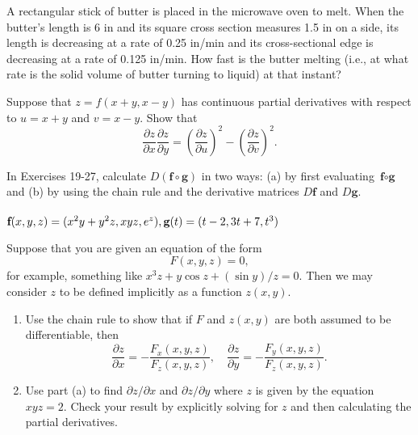 \documentclass[12pt,letterpaper]{hmcpset}
\newcommand{\pn}[1]{\left( #1 \right)}
\newcommand{\pf}[2]{\frac{\partial#1}{\partial#2}}
\begin{document}

\begin{problem}[2.5.6]
    A rectangular stick of butter is placed in the microwave oven to
    melt. When the butter's length is 6 in and its square cross
    section measures 1.5 in on a side, its length is decreasing at a
    rate of 0.25 in/min and its cross-sectional edge is decreasing at
    a rate of 0.125 in/min. How fast is the butter melting (i.e., at
    what rate is the solid volume of butter turning to liquid) at that
    instant?
\end{problem}
\begin{solution}
    \vfill
\end{solution}
\newpage

\begin{problem}[2.5.14]
    Suppose that $z=f(x+y,x-y)$ has continuous partial derivatives
    with respect to $u=x+y$ and $v=x-y$. Show that
    \[
        \pf{z}{x}\pf{z}{y}=\pn{\pf{z}{u}}^2-\pn{\pf{z}{v}}^2.
    \]
\end{problem}
\begin{solution}
    \vfill
\end{solution}
\newpage

\begin{problem}[2.5.24]
    In Exercises 19-27, calculate $D(\textbf{f}\circ\textbf{g})$ in
    two ways: (a) by first evaluating $\textbf{f}\circ\textbf{g}$ and
    (b) by using the chain rule and the derivative matrices
    $D\textbf{f}$ and $D\textbf{g}$.\\\\
    $\textbf{f}(x,y,z)=(x^2y+y^2z,xyz,e^z),\\
    \textbf{g}(t)=(t-2,3t+7,t^3)$
\end{problem}
\begin{solution}
    \vfill
\end{solution}
\newpage

\begin{problem}[2.5.36]
    Suppose that you are given an equation of the form
    \[
        F(x,y,z)=0,
    \]
    for example, something like $x^3z+y\cos z+(\sin y)/z=0$. Then we
    may consider $z$ to be defined implicitly as a function $z(x,y)$.
    \begin{enumerate}
        \item Use the chain rule to show that if $F$ and $z(x,y)$ are
            both assumed to be differentiable, then
            \[
                \pf{z}{x}=-\frac{F_x(x,y,z)}{F_z(x,y,z)},\quad
                \pf{z}{y}=-\frac{F_y(x,y,z)}{F_z(x,y,z)}.
            \]
        \item Use part (a) to find $\partial z/\partial x$ and
            $\partial z/\partial y$ where $z$ is given by the equation
            $xyz=2$. Check your result by explicitly solving for $z$ and
            then calculating the partial derivatives.
    \end{enumerate}
\end{problem}
\begin{solution}
    \vfill
\end{solution}
\newpage
\end{document}
